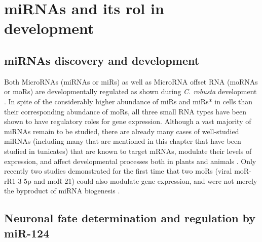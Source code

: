 \documentclass[graybox]{svmult}
\begin{document}
\section{miRNAs and its rol in development}
\label{sec:3}

\subsection{miRNAs discovery and development}

Both MicroRNAs (miRNAs or miRs) as well as MicroRNA offset RNA (moRNAs or moRs) 
are developmentally regulated as shown during \textit{C. robusta} development 
\cite{Shi2009}. In spite of the considerably higher abundance of miRs and 
miRs* in cells than their corresponding abundance of moRs, all three small RNA 
types have been shown to have regulatory roles for gene expression. Although a 
vast majority of miRNAs remain to be studied, there are already many cases of 
well-studied miRNAs (including many that are mentioned in this chapter that 
have been studied in tunicates) that are known to target mRNAs, modulate their 
levels of expression, and affect developmental processes both in plants and 
animals \cite{Zhao2018}. Only recently two studies demonstrated for 
the first time that two moRs (viral moR-rR1-3-5p and moR-21) could also 
modulate gene expression, and were not merely the byproduct of miRNA biogenesis 
\cite{UMBACH2010592, Zhao2016}.

\subsection{Neuronal fate determination and regulation by miR-124}
\end{document}
